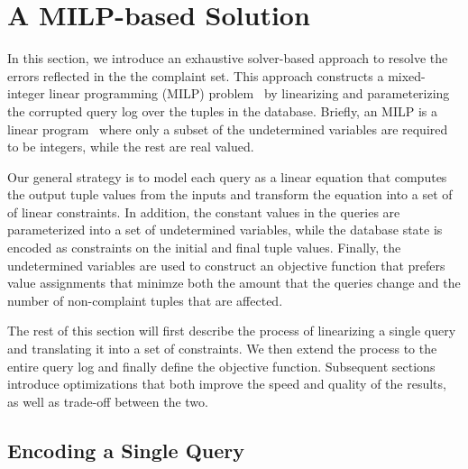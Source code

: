 \section{A MILP-based Solution}
\label{sec:sol}

In this section, we introduce an exhaustive solver-based approach to 
resolve the errors reflected in the the complaint set.
This approach constructs a mixed-integer linear 
programming (MILP) problem~\cite{milp} by linearizing and parameterizing the 
corrupted query log over the tuples in the database. 
Briefly, an MILP is a linear program~\cite{} where only a subset of the undetermined variables
are required to be integers, while the rest are real valued.

Our general strategy is to model each query as a linear equation 
that computes the output tuple values from the inputs and transform the
equation into a set of of linear constraints.   
In addition, the constant values in the queries are parameterized
into a set of undetermined variables, while the database state is encoded 
as constraints on the initial and final tuple values.
Finally, the undetermined variables are used to construct an objective function
that prefers value assignments that minimze both the amount that the queries change and
the number of non-complaint tuples that are affected.

The rest of this section will first describe the process of linearizing a single query
and translating it into a set of constraints.  We then extend the process to the entire
query log and finally define the objective function.
Subsequent sections introduce optimizations that both
improve the speed and quality of the results, as well as trade-off between the two. 








\subsection{Encoding a Single Query}%
\label{sec:linearize}

